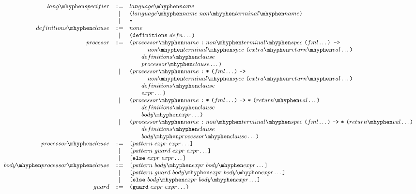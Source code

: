 \documentclass[letterpaper,10pt]{article}
\begin{document}
\[
\begin{array}{rcl}
lang\mhyphen specifier &::=& language\mhyphen name\\
&|& {\hbox{\tt (}}language\mhyphen name\ non\mhyphen terminal\mhyphen name{\hbox{\tt )}}\\
&|& {\hbox{\tt *}}\\
definitions\mhyphen clause &::=& none\\
&|& {\hbox{\tt (definitions}}\ defn \ldots {\hbox{\tt )}}\\
procesor &::=& {\hbox{\tt (}}processor\mhyphen name\ {\hbox{\tt :}}\ non\mhyphen terminal\mhyphen spec\ {\hbox{\tt (}}fml \ldots {\hbox{\tt ) ->}}\\
&& \qquad \quad non\mhyphen terminal\mhyphen spec\ {\hbox{\tt (}}extra\mhyphen return\mhyphen val \ldots {\hbox{\tt )}}\\
&& \qquad definitions\mhyphen clause\\
&& \qquad processor\mhyphen clause \ldots {\hbox{\tt )}}\\
&|& {\hbox{\tt (}}processor\mhyphen name\ {\hbox{\tt :}}\ {\hbox{\tt *}}\ {\hbox{\tt (}}fml \ldots {\hbox{\tt )}}\ {\hbox{\tt ->}}\\
&& \qquad \quad non\mhyphen terminal\mhyphen spec\ {\hbox{\tt (}}extra\mhyphen return\mhyphen val \ldots {\hbox{\tt )}}\\
&& \qquad definitions\mhyphen clause\\
&& \qquad expr \ldots {\hbox{\tt )}}\\
&|& {\hbox{\tt (}}processor\mhyphen name\ {\hbox{\tt :}}\ {\hbox{\tt *}}\ {\hbox{\tt (}}fml \ldots {\hbox{\tt )}}\ {\hbox{\tt ->}}\ {\hbox{\tt *}}\ {\hbox{\tt (}}return\mhyphen val \ldots {\hbox{\tt )}}\\
&& \qquad definitions\mhyphen clause\\
&& \qquad body\mhyphen expr \ldots {\hbox{\tt )}}\\
&|& {\hbox{\tt (}}processor\mhyphen name\ {\hbox{\tt :}}\ non\mhyphen terminal\mhyphen spec\ {\hbox{\tt (}}fml \ldots {\hbox{\tt )}}\ {\hbox{\tt ->}}\ {\hbox{\tt *}}\ {\hbox{\tt (}}return\mhyphen val \ldots {\hbox{\tt )}}\\
&& \qquad definitions\mhyphen clause\\
&& \qquad body\mhyphen processor\mhyphen clause \ldots {\hbox{\tt )}}\\
processor\mhyphen clause &::=& {\hbox{\tt [}}pattern\ expr\ expr \ldots {\hbox{\tt ]}}\\
&|& {\hbox{\tt [}}pattern\ guard\ expr\ expr \ldots{\hbox{\tt ]}}\\
&|& {\hbox{\tt [else}}\ expr\ expr \ldots{\hbox{\tt ]}}\\
body\mhyphen processor\mhyphen clause &::=& {\hbox{\tt [}}pattern\ body\mhyphen expr\ body\mhyphen expr \ldots{\hbox{\tt ]}}\\
&|& {\hbox{\tt [}}pattern\ guard\ body\mhyphen expr\ body\mhyphen expr \ldots {\hbox{\tt ]}}\\
&|& {\hbox{\tt [else}}\ body\mhyphen expr\ body\mhyphen expr \ldots {\hbox{\tt ]}}\\
guard &::=& {\hbox{\tt (guard}}\ expr\ expr \ldots {\hbox{\tt )}}
\end{array}
\]
\end{document}
